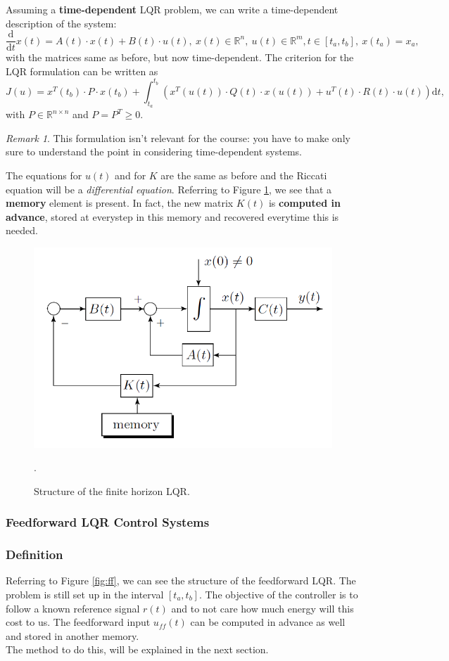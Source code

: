 \documentclass[a4paper,12 pt]{article}
\numberwithin{equation}{section}
\theoremstyle{definition}
\theoremstyle{remark}
\newtheorem*{bmk}{Remark}
\theoremstyle{definition}
\theoremstyle{definition}
\theoremstyle{definition}
\theoremstyle{remark}
\begin{document}
Assuming a \textbf{time-dependent} LQR problem, we can write a time-dependent description of the system:
\begin{equation}
\frac{\text{d}}{\text{d}t}x(t)=A(t)\cdot x(t) + B(t) \cdot u(t), \ x(t) \in \mathbb{R}^n, \ u(t) \in \mathbb{R}^m, t\in [t_a,t_b], \ x(t_a)=x_a,
\end{equation}
with the matrices same as before, but now time-dependent.
The criterion for the LQR formulation can be written as
\begin{equation}
J(u)=x^T(t_b)\cdot P \cdot x(t_b) + \int_{t_a}^{t_b}\left( x^T(u(t))\cdot Q(t) \cdot x(u(t))+u^T(t)\cdot R(t)\cdot u(t) \right) \text{d}t,
\end{equation}
with $P\in \mathbb{R}^{n\times n}$ and $P=P^T\geq 0$.
\begin{bmk}
This formulation isn't relevant for the course: you have to make only sure to understand the point in considering time-dependent systems.
\end{bmk}
The equations for $u(t)$ and for $K$ are the same as before and the Riccati equation will be a \textit{differential equation}. Referring to Figure \ref{fig:finitehor}, we see that a \textbf{memory} element is present. In fact, the new matrix $K(t)$ is \textbf{computed in advance}, stored at everystep in this memory and recovered everytime this is needed.

\begin{figure}[h]
\centering
\includegraphics[width=0.65\columnwidth]{finitehor}
\caption{Structure of the finite horizon LQR. }
\label{fig:finitehor}.
\end{figure}

\newpage
\subsubsection{Feedforward LQR Control Systems}
\subsubsection*{Definition}
Referring to Figure \ref{fig:ff}, we can see the structure of the feedforward LQR. The problem is still set up in the interval $[t_a,t_b]$. The objective of the controller is to follow a known reference signal $r(t)$ and to not care how much energy will this cost to us. The feedforward input $u_{ff}(t)$ can be computed in advance as well and stored in another memory. \\
The method to do this, will be explained in the next section. 
\end{document}

